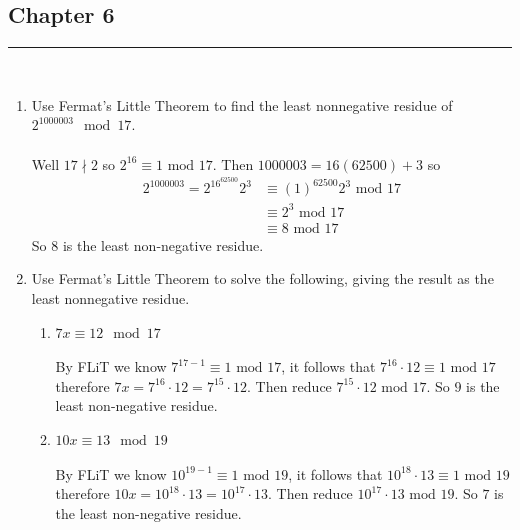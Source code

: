 \documentclass[class=article, crop=false]{standalone}
\begin{document}
\subsection{Chapter 6}
\rule{\textwidth}{1pt}\\
\begin{enumerate}
\item
  Use Fermat's Little Theorem
  to find the least nonnegative residue of
  $2^{1000003}\mod 17$. \\\\
  Well $17\nmid 2$ so $2^{16} \equiv 1\mbox{ mod }17$. Then $1000003 = 16(62500) + 3$ so
  \begin{align*}
	2^{1000003}= 2^{16^{62500}} 2^3 &\equiv (1)^{62500} 2^{3} \mbox{ mod }17 \\
	&\equiv 2^3\mbox{ mod }17 \\
	&\equiv 8\mbox{ mod }17
  \end{align*}
  So $8$ is the least non-negative residue.

\item
  Use Fermat's Little Theorem to solve the following,
  giving the result as the least nonnegative residue.
  \begin{enumerate}
  \item
	$7x\equiv 12\mod 17$ \\\\
	By FLiT we know $7^{17-1} \equiv 1\mbox{ mod }17$, it follows that
	$7^{16}\cdot 12 \equiv 1\mbox{ mod }17$ therefore $7x = 7^{16}\cdot 12 = 7^{15}\cdot 12$.
	Then reduce $7^{15}\cdot 12\mbox{ mod }17$. So $9$ is the least non-negative residue.

  \item
	$10x\equiv 13\mod 19$ \\\\
	By FLiT we know $10^{19-1} \equiv 1\mbox{ mod }19$, it follows that
	$10^{18}\cdot 13 \equiv 1\mbox{ mod }19$ therefore $10x = 10^{18}\cdot 13 = 10^{17}\cdot 13$.
	Then reduce $10^{17}\cdot 13\mbox{ mod }19$. So $7$ is the least non-negative residue.

\end{enumerate}


\end{enumerate}
\end{document}

